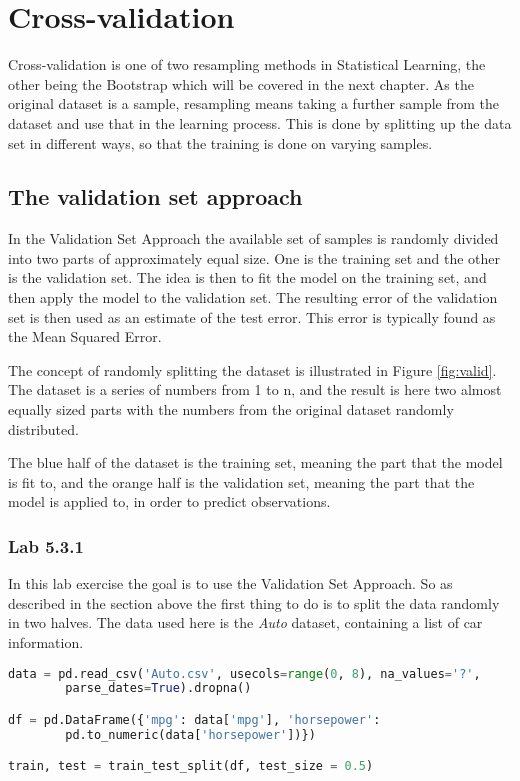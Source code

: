 \chapter{Cross-validation}
\label{chp:crossval}
Cross-validation is one of two resampling methods in Statistical Learning, the other being the Bootstrap which will be covered in the next chapter. As the original dataset is a sample, resampling means taking a further sample from the dataset and use that in the learning process. This is done by splitting up the data set in different ways, so that the training is done on varying samples. 


\section{The validation set approach}
\label{sec:VSA}
In the Validation Set Approach the available set of samples is randomly divided into two parts of approximately equal size. One is the training set and the other is the validation set. The idea is then to fit the model on the training set, and then apply the model to the validation set. The resulting error of the validation set is then used as an estimate of the test error. This error is typically found as the Mean Squared Error. 


The concept of randomly splitting the dataset is illustrated in Figure \ref{fig:valid}. The dataset is a series of numbers from 1 to n, and the result is here two almost equally sized parts with the numbers from the original dataset randomly distributed. 

The blue half of the dataset is the training set, meaning the part that the model is fit to, and the orange half is the validation set, meaning the part that the model is applied to, in order to predict observations. 

\subsection{Lab 5.3.1}
In this lab exercise the goal is to use the Validation Set Approach. So as described in the section above the first thing to do is to split the data randomly in two halves. The data used here is the \emph{Auto} dataset, containing a list of car information. 

\begin{lstlisting}[language=Python, label=lst:lst_valid, caption=Auto dataset randomly split]
data = pd.read_csv('Auto.csv', usecols=range(0, 8), na_values='?',
		parse_dates=True).dropna()

df = pd.DataFrame({'mpg': data['mpg'], 'horsepower':  
		pd.to_numeric(data['horsepower'])})

train, test = train_test_split(df, test_size = 0.5)
\end{lstlisting}

